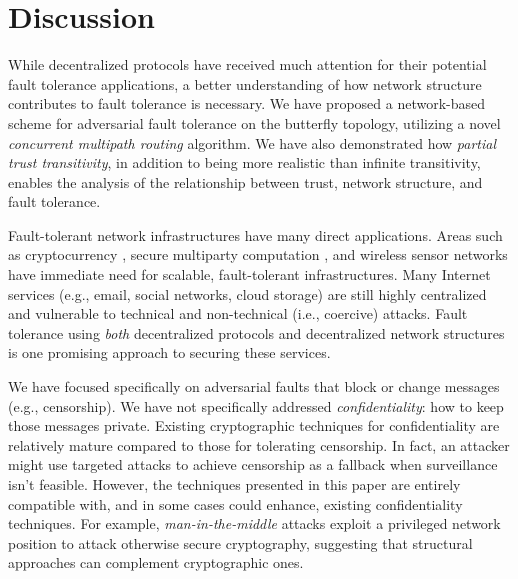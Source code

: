 \documentclass{sig-alternate-05-2015}
\begin{document}
\section{Discussion}
\label{sec-discussion}

While decentralized protocols have received much attention for their potential
fault tolerance applications,
a better understanding of how network structure contributes to fault tolerance
is necessary.
We have proposed a network-based scheme for adversarial fault tolerance on the
butterfly topology,
utilizing a novel {\em concurrent multipath routing} algorithm.
We have also demonstrated how {\em partial trust transitivity},
in addition to being more realistic than infinite transitivity,
enables the analysis of the relationship between trust, network structure,
and fault tolerance.

Fault-tolerant network infrastructures have many direct applications.
Areas such as cryptocurrency
\cite{mazieres_stellar_2015,nakamoto_bitcoin:_2008,king_ppcoin:_2012},
secure multiparty computation
\cite{yao_protocols_1982,chaum_multiparty_1988,goldreich_how_1987},
and wireless sensor networks
\cite{khiani_comparative_2013}
have immediate need for scalable, fault-tolerant infrastructures.
Many Internet services (e.g., email, social networks, cloud storage)
are still highly centralized and vulnerable to technical and
non-technical (i.e., coercive) attacks.
Fault tolerance using {\em both}
decentralized protocols and
decentralized network structures
is one promising approach to securing these services.

We have focused specifically on adversarial faults that block or
change messages (e.g., censorship).
We have not specifically addressed {\em confidentiality}:
how to keep those messages private.
Existing cryptographic techniques for confidentiality are relatively
mature compared to those for tolerating censorship.
In fact, an attacker might use targeted attacks to achieve censorship
as a fallback when surveillance isn't feasible.
However, the techniques presented in this paper
are entirely compatible with, and in some cases could enhance, existing
confidentiality techniques.
For example, {\em man-in-the-middle} attacks exploit a privileged
network position to attack otherwise secure cryptography,
suggesting that structural approaches can complement cryptographic ones.
\end{document}

